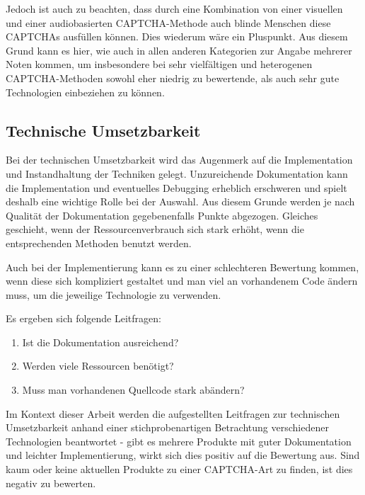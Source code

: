 Jedoch ist auch zu beachten, dass durch eine Kombination von einer visuellen 
und einer audiobasierten CAPTCHA-Methode auch blinde Menschen diese CAPTCHAs ausfüllen können. 
Dies wiederum wäre ein Pluspunkt. 
Aus diesem Grund kann es hier, wie auch in allen anderen Kategorien zur Angabe mehrerer Noten kommen,
um insbesondere bei sehr vielfältigen und heterogenen CAPTCHA-Methoden sowohl eher niedrig zu bewertende, 
als auch sehr gute Technologien einbeziehen zu können.

\subsection{Technische Umsetzbarkeit}
\label{ch:matrix:aspekte:tu}

Bei der technischen Umsetzbarkeit wird das Augenmerk auf die Implementation und Instandhaltung der Techniken gelegt.
Unzureichende Dokumentation kann die Implementation und eventuelles Debugging erheblich erschweren
und spielt deshalb eine wichtige Rolle bei der Auswahl.
Aus diesem Grunde werden je nach Qualität der Dokumentation gegebenenfalls Punkte abgezogen.
Gleiches geschieht, wenn der Ressourcenverbrauch sich stark erhöht, wenn die entsprechenden Methoden benutzt werden.

Auch bei der Implementierung kann es zu einer schlechteren Bewertung kommen, wenn diese sich kompliziert gestaltet und man viel an vorhandenem Code ändern muss,
um die jeweilige Technologie zu verwenden.

Es ergeben sich folgende Leitfragen:
\begin{enumerate}
    \item Ist die Dokumentation ausreichend? 
    \item Werden viele Ressourcen benötigt?
    \item Muss man vorhandenen Quellcode stark abändern?
\end{enumerate}

Im Kontext dieser Arbeit werden die aufgestellten Leitfragen zur technischen Umsetzbarkeit anhand einer stichprobenartigen Betrachtung verschiedener 
Technologien beantwortet - gibt es mehrere Produkte mit guter Dokumentation und leichter Implementierung,
wirkt sich dies positiv auf die Bewertung aus.
Sind kaum oder keine aktuellen Produkte zu einer CAPTCHA-Art zu finden, ist dies negativ zu bewerten.
 

